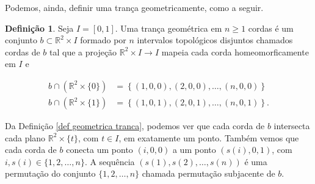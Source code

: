 \documentclass[a4paper,portuguese,11pt,twoside, leqno]{book}
\theoremstyle{definition}
\newtheorem{deff}{Definição}[section]
\newtheorem*{solution}{Solução}
\begin{document}
	
	
	
	\par\vspace{0.3cm} Podemos, ainda, definir uma trança geometricamente, como a seguir.
	
	\begin{deff}
		\label{def geometrica tranca}
		Seja $I = [0,1]$. Uma trança geométrica em $n\geq 1$ cordas é um conjunto $b\subset\mathbb{R}^2\times I$ formado por $n$ intervalos topológicos disjuntos chamados cordas de $b$ tal que a projeção $\mathbb{R}^2\times I\to I$ mapeia cada corda homeomorficamente em $I$ e 
		
		\begin{align*}
		b\cap (\mathbb{R}^2\times \{ 0 \}) &= \left\{ (1,0,0), (2,0,0), \dots, (n,0,0) \right\} \\
		b\cap (\mathbb{R}^2\times \{ 1 \}) &= \left\{ (1,0,1), (2,0,1), \dots, (n,0,1) \right\}.
		\end{align*}
	\end{deff}
	
	\par\vspace{0.3cm} Da Definição \eqref{def geometrica tranca}, podemos ver que cada corda de $b$ intersecta cada plano $\mathbb{R}^2\times\{t\}$, com $t\in I$, em exatamente um ponto. Também vemos que cada corda de $b$ conecta um ponto $(i,0,0)$ a um ponto $(s(i), 0, 1)$, com $i,s(i)\in \{1, 2, \dots, n\}$. A sequência $(s(1), s(2), \dots, s(n))$ é uma permutação do conjunto $\{1, 2, \dots, n\}$ chamada permutação subjacente de $b$.
	
\end{document}
